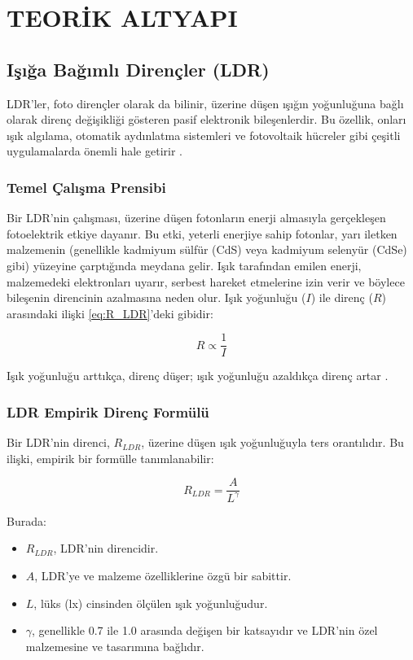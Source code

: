 \section{TEORİK ALTYAPI}

\subsection{Işığa Bağımlı Dirençler (LDR)}

LDR'ler, foto dirençler olarak da bilinir, üzerine düşen ışığın yoğunluğuna bağlı olarak direnç değişikliği gösteren pasif elektronik bileşenlerdir. Bu özellik, onları ışık algılama, otomatik aydınlatma sistemleri ve fotovoltaik hücreler gibi çeşitli uygulamalarda önemli hale getirir \cite{perkinelmer2001}.

\subsubsection{Temel Çalışma Prensibi}
Bir LDR'nin çalışması, üzerine düşen fotonların enerji almasıyla gerçekleşen fotoelektrik etkiye dayanır. Bu etki, yeterli enerjiye sahip fotonlar, yarı iletken malzemenin (genellikle kadmiyum sülfür (CdS) veya kadmiyum selenyür (CdSe) gibi) yüzeyine çarptığında meydana gelir. Işık tarafından emilen enerji, malzemedeki elektronları uyarır, serbest hareket etmelerine izin verir ve böylece bileşenin direncinin azalmasına neden olur. Işık yoğunluğu (\(I\)) ile direnç (\(R\)) arasındaki ilişki \eqref{eq:R_LDR}'deki gibidir:

\begin{equation}
R \propto \frac{1}{I}
\label{eq:R_LDR}
\end{equation}

Işık yoğunluğu arttıkça, direnç düşer; ışık yoğunluğu azaldıkça direnç artar \cite{khan2005introduction}.

\subsubsection{LDR Empirik Direnç Formülü}

Bir LDR'nin direnci, \( R_{LDR} \), üzerine düşen ışık yoğunluğuyla ters orantılıdır. Bu ilişki, empirik bir formülle tanımlanabilir:

\begin{equation}
R_{LDR} = \frac{A}{L^{\gamma}}
\label{eq:LDR_emp}
\end{equation}

Burada:
\begin{itemize}
    \item \( R_{LDR} \), LDR'nin direncidir.
    \item \( A \), LDR'ye ve malzeme özelliklerine özgü bir sabittir.
    \item \( L \), lüks (lx) cinsinden ölçülen ışık yoğunluğudur.
    \item \( \gamma \), genellikle 0.7 ile 1.0 arasında değişen bir katsayıdır ve LDR'nin özel malzemesine ve tasarımına bağlıdır.
\end{itemize}

